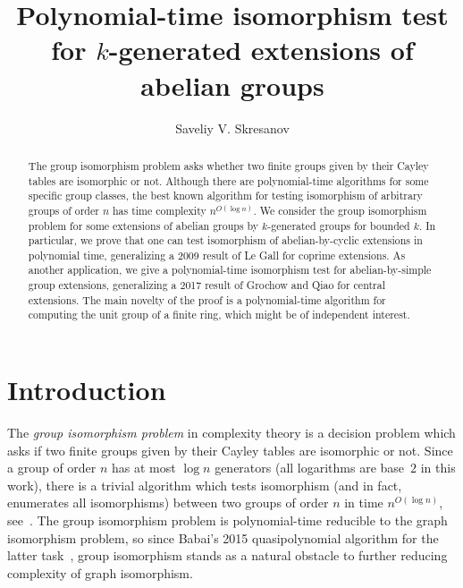 \documentclass{article}
\title{Polynomial-time isomorphism test for $k$-generated extensions of abelian groups}
\author{Saveliy V. Skresanov}
\date{}
\begin{document}
\maketitle

\begin{abstract}
	The group isomorphism problem asks whether two finite groups given by their Cayley tables
	are isomorphic or not. Although there are poly\-nomial-time algorithms for some specific group classes,
	the best known algorithm for testing isomorphism of arbitrary groups of order \( n \) has time complexity \( n^{O(\log n)} \).
	We consider the group isomorphism problem for some extensions of abelian groups by \( k \)-generated groups for bounded \( k \).
	In particular, we prove that one can test isomorphism of abelian-by-cyclic extensions in polynomial time,
	generalizing a 2009 result of Le Gall for coprime extensions. As another application, we give a polynomial-time
	isomorphism test for abelian-by-simple group extensions, generalizing a 2017 result of Grochow and Qiao for central extensions.
	The main novelty of the proof is a polynomial-time algorithm for computing the unit group of a finite ring, which might be of independent interest.
\end{abstract}

\section{Introduction}

The \emph{group isomorphism problem} in complexity theory is a decision problem which asks if two finite groups
given by their Cayley tables are isomorphic or not. Since a group of order \( n \) has at most \( \log n \) generators
(all logarithms are base~\( 2 \) in this work), there is a trivial algorithm which tests isomorphism (and in fact, enumerates all isomorphisms)
between two groups of order \( n \) in time \( n^{O(\log n)} \), see~\cite{miller}.
The group isomorphism problem is polynomial-time reducible to the graph isomorphism problem, so since Babai's 2015 quasipolynomial
algorithm for the latter task~\cite{babai}, group isomorphism stands as a natural obstacle to further reducing complexity of graph isomorphism.
\end{document}
